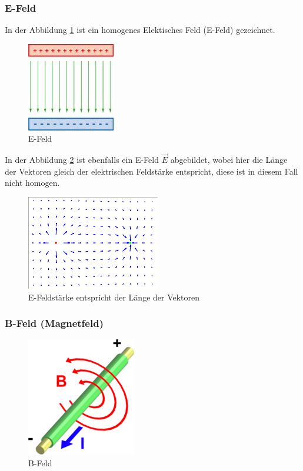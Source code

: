 \documentclass[a4paper]{scrartcl}
\begin{document}
\subsubsection{E-Feld}

In der Abbildung \ref{fig:E-Feld} ist ein homogenes Elektisches Feld (E-Feld) gezeichnet.

\begin{figure}[h!]
\begin{center}
\includegraphics[scale=0.5]{images/E-Feld.jpg}
\caption{E-Feld}
\label{fig:E-Feld}
\end{center}
\end{figure}

In der Abbildung \ref{fig:E-Feldstaerke} ist ebenfalls ein E-Feld $ \vec{E} $ abgebildet, wobei hier die Länge der Vektoren gleich der elektrischen Feldstärke entspricht, diese ist in diesem Fall nicht homogen.

\begin{figure}[h!]
\begin{center}
\includegraphics[scale=0.5]{images/E-Feldstaerke.png}
\caption{E-Feldstärke entspricht der Länge der Vektoren}
\label{fig:E-Feldstaerke}
\end{center}
\end{figure}



\subsubsection{B-Feld (Magnetfeld)}
\begin{figure}[h!]
\begin{center}
\includegraphics[scale=0.5]{images/B-Feld.png}
\caption{B-Feld}
\label{fig:B-Feld}
\end{center}
\end{figure}
\end{document}
